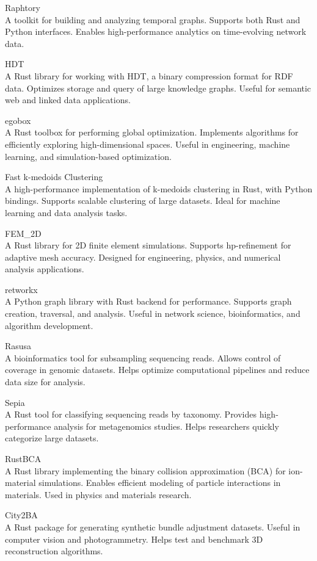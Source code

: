 \documentclass{article}
\begin{document}
Raphtory\\
A toolkit for building and analyzing temporal graphs. Supports both Rust and Python
interfaces. Enables high-performance analytics on time-evolving network data.

HDT\\
A Rust library for working with HDT, a binary compression format for RDF data. Optimizes
storage and query of large knowledge graphs. Useful for semantic web and linked data applications.

egobox\\
A Rust toolbox for performing global optimization. Implements algorithms for efficiently
exploring high-dimensional spaces. Useful in engineering, machine learning, and simulation-based
optimization.

Fast k-medoids Clustering\\
A high-performance implementation of k-medoids clustering in Rust, with
Python bindings. Supports scalable clustering of large datasets. Ideal for machine learning and
data analysis tasks.

FEM\_2D\\
A Rust library for 2D finite element simulations. Supports hp-refinement for adaptive
mesh accuracy. Designed for engineering, physics, and numerical analysis applications.

retworkx\\
A Python graph library with Rust backend for performance. Supports graph creation,
traversal, and analysis. Useful in network science, bioinformatics, and algorithm development.

Rasusa\\
A bioinformatics tool for subsampling sequencing reads. Allows control of coverage in
genomic datasets. Helps optimize computational pipelines and reduce data size for analysis.

Sepia\\
A Rust tool for classifying sequencing reads by taxonomy. Provides high-performance
analysis for metagenomics studies. Helps researchers quickly categorize large datasets.

RustBCA\\
A Rust library implementing the binary collision approximation (BCA) for ion-material
simulations. Enables efficient modeling of particle interactions in materials. Used in physics and
materials research.

City2BA\\
A Rust package for generating synthetic bundle adjustment datasets. Useful in computer
vision and photogrammetry. Helps test and benchmark 3D reconstruction algorithms.
\end{document}
